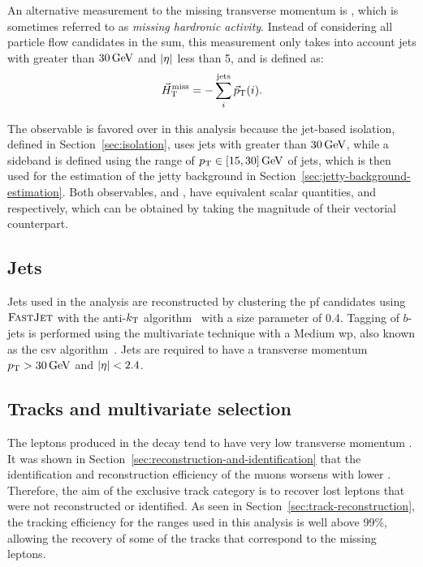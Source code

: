 An alternative measurement to the missing transverse momentum is \htvecmiss, which is sometimes referred to as \emph{missing hardronic activity}. Instead of considering all particle flow candidates in the sum, this measurement only takes into account jets with \pt greater than $30\,\text{Ge\hspace{-.08em}V}$ and $\abs{\eta}$ less than 5, and is defined as:
\begin{equation}
\vec{H}_{\text{T}}^{\text{miss}} = -\sum_i^{\mathrm{jets}} {\vec p}_{\mathrm{T}}(i).
\end{equation}

The observable \htvecmiss is favored over \VEtmiss in this analysis because the jet-based isolation, defined in Section~\ref{sec:isolation}, uses jets with \pt greater than $30\,\text{Ge\hspace{-.08em}V}$, while a sideband is defined using the range of $p_{\mathrm{T}}\in [15,30]\,\text{Ge\hspace{-.08em}V}$ of jets, which is then used for the estimation of the jetty background in Section~\ref{sec:jetty-background-estimation}. Both observables, \VEtmiss and \htvecmiss, have equivalent scalar quantities, \MET and \mht respectively, which can be obtained by taking the magnitude of their vectorial counterpart.

\subsection{Jets}
\label{subsec:jets}

Jets used in the analysis are reconstructed by clustering the \gls{pf} candidates using ${\textsc{FastJet}}$ with the anti-$k_{\mathrm{T}}$ algorithm~\cite{Cacciari_2008_antikt} with a size parameter of 0.4. Tagging of $b$-jets is performed using the multivariate technique \DEEPCSV with a Medium \gls{wp}, also known as the \gls{csv} algorithm~\cite{BTV-16-002}. Jets are required to have a transverse momentum $p_{\mathrm{T}}>30\,\text{Ge\hspace{-.08em}V}$ and $\abs{\eta}<2.4$.

\clearpage
\subsection{Tracks and multivariate selection }
\label{sec:track-bdt}

The leptons \ellell produced in the decay \neuttdecay tend to have very low transverse momentum \pt. It was shown in Section~\ref{sec:reconstruction-and-identification} that the identification and reconstruction efficiency of the muons worsens with lower \pt. Therefore, the aim of the exclusive track category is to recover lost leptons that were not reconstructed or identified. As seen in Section~\ref{sec:track-reconstruction}, the tracking efficiency for the \pt ranges used in this analysis is well above 99\%, allowing the recovery of some of the  tracks that correspond to the missing leptons.

